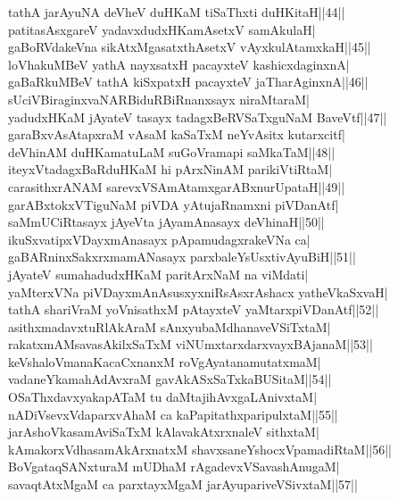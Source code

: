 \documentclass{article}
\begin{document}
tathA jarAyuNA deVheV duHKaM tiSaThxti duHKitaH||44||\\
patitasAsxgareV yadavxdudxHKamAsetxV samAkulaH|\\
gaBoRVdakeVna sikAtxMgasatxthAsetxV vAyxkulAtamxkaH||45||\\
loVhakuMBeV yathA nayxsatxH pacayxteV kashicxdaginxnA|\\
gaBaRkuMBeV tathA kiSxpatxH pacayxteV jaTharAginxnA||46||\\
sUciVBiraginxvaNARBiduRBiRnanxsayx niraMtaraM|\\
yadudxHKaM jAyateV tasayx tadagxBeRVSaTxguNaM BaveVtf||47||\\
garaBxvAsAtapxraM vAsaM kaSaTxM neYvAsitx kutarxcitf|\\
deVhinAM duHKamatuLaM suGoVramapi saMkaTaM||48||\\
iteyxVtadagxBaRduHKaM hi pArxNinAM parikiVtiRtaM|\\
carasithxrANAM sarevxVSAmAtamxgarABxnurUpataH||49||\\
garABxtokxVTiguNaM piVDA yAtujaRnamxni piVDanAtf|\\
saMmUCiRtasayx jAyeVta jAyamAnasayx deVhinaH||50||\\
ikuSxvatipxVDayxmAnasayx pApamudagxrakeVNa ca|\\
gaBARninxSakxrxmamANasayx parxbaleYsUsxtivAyuBiH||51||\\
jAyateV sumahadudxHKaM paritArxNaM na viMdati|\\
yaMterxVNa piVDayxmAnAsusxyxniRsAsxrAshacx yatheVkaSxvaH|\\
tathA shariVraM yoVnisathxM pAtayxteV yaMtarxpiVDanAtf||52||\\
asithxmadavxtuRlAkAraM sAnxyubaMdhanaveVSiTxtaM|\\
rakatxmAMsavasAkilxSaTxM viNUmxtarxdarxvayxBAjanaM||53||\\
keVshaloVmanaKacaCxnanxM roVgAyatanamutatxmaM|\\
vadaneYkamahAdAvxraM gavAkASxSaTxkaBUSitaM||54||\\
OSaThxdavxyakapATaM tu daMtajihAvxgaLAnivxtaM|\\
nADiVsevxVdaparxvAhaM ca kaPapitathxparipulxtaM||55||\\
jarAshoVkasamAviSaTxM kAlavakAtxrxnaleV sithxtaM|\\
kAmakorxVdhasamAkArxnatxM shavxsaneYshocxVpamadiRtaM||56||\\
BoVgataqSANxturaM mUDhaM rAgadevxVSavashAnugaM|\\
savaqtAtxMgaM ca parxtayxMgaM jarAyupariveVSivxtaM||57||\\
\end{document}
